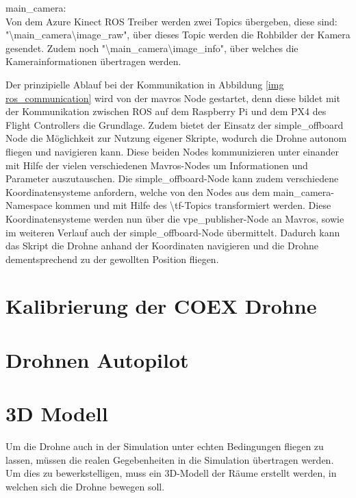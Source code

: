 main\_camera: \\
Von dem Azure Kinect ROS Treiber werden zwei Topics übergeben, diese sind: \\
"\textbackslash main\_camera\textbackslash image\_raw", über dieses Topic werden die Rohbilder der Kamera gesendet. Zudem noch "\textbackslash main\_camera\textbackslash image\_info", über welches die Kamerainformationen übertragen werden. \cite[vgl.][]{kinect_ros_driver}\\

Der prinzipielle Ablauf bei der Kommunikation in Abbildung \ref{img ros_communication} wird von der mavros Node gestartet, denn diese bildet mit der Kommunikation zwischen ROS auf dem Raspberry Pi und dem PX4 des Flight Controllers die Grundlage. Zudem bietet der Einsatz der simple\_offboard Node die Möglichkeit zur Nutzung eigener Skripte, wodurch die Drohne autonom fliegen und navigieren kann. Diese beiden Nodes kommunizieren unter einander mit Hilfe der vielen verschiedenen Mavros-Nodes um Informationen und Parameter auszutauschen. Die simple\_offboard-Node kann zudem verschiedene Koordinatensysteme anfordern, welche von den Nodes aus dem main\_camera-Namespace kommen und mit Hilfe des \textbackslash tf-Topics transformiert werden. Diese Koordinatensysteme werden nun über die vpe\_publisher-Node an Mavros, sowie im weiteren Verlauf auch der simple\_offboard-Node übermittelt. Dadurch kann das Skript die Drohne anhand der Koordinaten navigieren und die Drohne dementsprechend zu der gewollten Position fliegen.

\section{Kalibrierung der COEX Drohne}

\section{Drohnen Autopilot}


\section{3D Modell}
Um die Drohne auch in der Simulation unter echten Bedingungen fliegen zu lassen, müssen die realen Gegebenheiten in die Simulation übertragen werden. Um dies zu bewerkstelligen, muss ein 3D-Modell der Räume erstellt werden, in welchen sich die Drohne bewegen soll.
